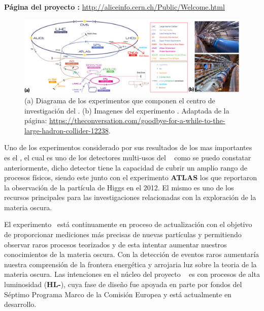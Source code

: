 \begin{itemize_f}
\textbf{Página del proyecto :} \url{http://aliceinfo.cern.ch/Public/Welcome.html}


\end{itemize_f}

\begin{figure}[h!]
    \centering
    \includegraphics[width=1\textwidth]{Analisis_y_Resultados/imagenes/cern.png}
    \caption{(a) Diagrama de los experimentos que componen el centro de investigación del \CERN. (b) Imagenes del experimento \LHC. Adaptada de la página: \url{https://theconversation.com/goodbye-for-a-while-to-the-large-hadron-collider-12238}.}
    \label{cern}
\end{figure}

Uno de los experimentos considerado por sus resultados de los mas importantes es el \CMS, el cual es uno de los detectores multi-usos del \CERN ~ como se puedo constatar anteriormente, dicho detector tiene la capacidad de cubrir un amplio rango de procesos físicos, siendo este junto con el experimento \textbf{ATLAS} los que reportaron la observación de la partícula de Higgs en el 2012. El mismo es uno de los recursos principales para las investigaciones relacionadas con la exploración de la materia oscura.

El experimento \LHC ~está continuamente en proceso de actualización con el objetivo de proporcionar mediciones más precisas de nuevas partículas y permitiendo observar raros procesos teorizados y de esta intentar aumentar  nuestros conocimientos de la materia oscura. Con la detección de eventos raros aumentaría nuestra comprensión de la frontera energética y arrojaria luz sobre la teoria de la materia oscura. Las intenciones en el núcleo del proyecto \LHC ~ es con procesos de alta luminosidad (\textbf{HL-}\LHC), cuya fase de diseño fue apoyada en parte por fondos del Séptimo Programa Marco de la Comisión Europea y está actualmente en desarrollo.






